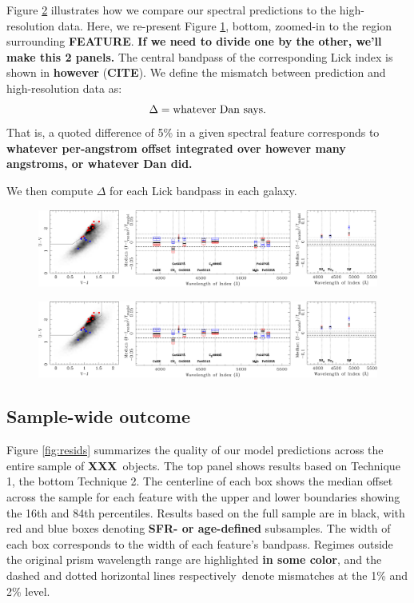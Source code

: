 \documentclass[a4paper,fleqn,usenatbib]{mnras}
\newcommand{\resp}{respectively}
\newcommand{\bfr}{\bf\color{red}}
\newcommand{\ntot}{{\bfr XXX}} %
\newcommand{\CITE}{{\bfr CITE}}
\begin{document}
Figure \ref{fig:metric} illustrates how we compare our spectral predictions to the high-resolution data.
Here, we re-present Figure \ref{fig:scheme}, bottom, zoomed-in to the region surrounding {\bfr FEATURE}.
{\bfr If we need to divide one by the other, we'll make this 2 panels.} The central bandpass of the corresponding
Lick index is shown in {\bfr however} (\CITE). We define the mismatch between prediction and high-resolution
data as:
\begin{equation}
	\Delta = {\rm whatever~Dan~says}.
\end{equation}
That is, a quoted difference of 5\% in a given spectral feature corresponds to {\bfr whatever per-angstrom
offset integrated over however many angstroms, or whatever Dan did.}

We then compute {\bfr$\Delta$} for each Lick bandpass in each galaxy.

\begin{figure}
	\includegraphics[width=\columnwidth]{residuals}
	\caption{}
	\label{fig:scheme}
\end{figure}

\begin{figure}
	\includegraphics[width=\columnwidth]{residuals}
	\caption{}
	\label{fig:metric}
\end{figure}

\subsection{Sample-wide outcome}

Figure \ref{fig:resids} summarizes the quality of our model predictions across the entire sample of
\ntot\ objects. The top panel shows results based on Technique 1, the bottom Technique 2. The centerline
of each box shows the median offset across the sample for each feature with the upper and lower boundaries
showing the 16th and 84th percentiles. Results based on the full sample are in black, with red and blue 
boxes denoting {\bfr SFR- or age-defined} subsamples. The width of each box corresponds to the width 
of each feature's bandpass. Regimes outside the original prism wavelength range are highlighted 
{\bfr in some color}, and the dashed and dotted horizontal lines \resp\ denote mismatches at the 
1\% and 2\% level.
\end{document}

